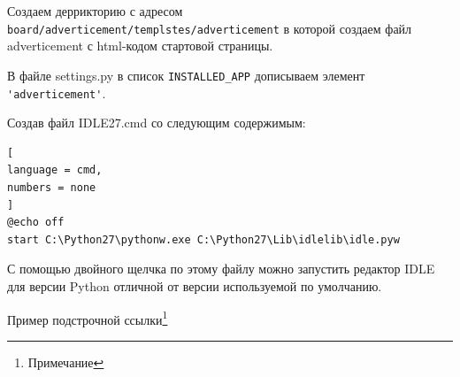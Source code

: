 \documentclass[%
	11pt,
	a4paper,
	utf8,
		]{article}
\begin{document}
Создаем деррикторию с адресом \lstinline{board/adverticement/templstes/adverticement} в которой создаем файл adverticement с html-кодом стартовой страницы.

В файле settings.py в список \lstinline{INSTALLED_APP} дописываем элемент \lstinline{'adverticement'}.




Создав файл IDLE27.cmd со следующим содержимым:
\begin{lstlisting}[
language = cmd,
numbers = none
]
@echo off
start C:\Python27\pythonw.exe C:\Python27\Lib\idlelib\idle.pyw
\end{lstlisting}


С помощью двойного щелчка по этому файлу можно запустить редактор IDLE для версии Python отличной от версии используемой по умолчанию.




\cite[стр.~34]{chacon:2020}


Пример подстрочной ссылки\footnote{Примечание}






\begin{thebibliography}{99}
	
\end{thebibliography}

\end{document}
